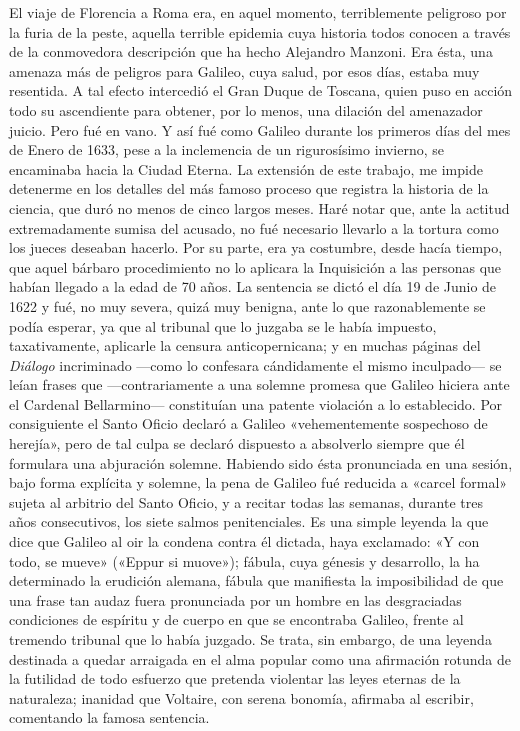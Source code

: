 \documentclass[a4paper, 12pt, draft]{article}
\begin{document}
{El viaje de Florencia a Roma era, en aquel momento, terriblemente peligroso por la furia de la peste, aquella terrible epidemia cuya historia todos conocen a través de la conmovedora descripción que ha hecho Alejandro Manzoni. Era ésta, una amenaza más de peligros para Galileo, cuya salud, por esos días, estaba muy resentida. A tal efecto intercedió el Gran Duque de Toscana, quien puso en acción todo su ascendiente para obtener, por lo menos, una dilación del amenazador juicio. Pero fué en vano. Y así fué como Galileo durante los primeros días del mes de Enero de 1633, pese a la inclemencia de un rigurosísimo invierno, se encaminaba hacia la Ciudad Eterna. La extensión de este trabajo, me impide detenerme en los detalles del más famoso proceso que registra la historia de la ciencia, que duró no menos de cinco largos meses. Haré notar que, ante la actitud extremadamente sumisa del acusado, no fué necesario llevarlo a la tortura como los jueces deseaban hacerlo. Por su parte, era ya costumbre, desde hacía tiempo, que aquel bárbaro procedimiento no lo aplicara la Inquisición a las personas que habían llegado a la edad de 70 años. La sentencia se dictó el día 19 de Junio de 1622 y fué, no muy severa, quizá muy benigna, ante lo que razonablemente se podía esperar, ya que al tribunal que lo juzgaba se le había impuesto, taxativamente, aplicarle la censura anticopernicana; y en muchas páginas del \textit{ Diálogo} incriminado ---como lo confesara cándidamente el mismo inculpado--- se leían frases que ---contrariamente a una solemne promesa que Galileo hiciera ante el Cardenal Bellarmino--- constituían una patente violación a lo establecido. Por consiguiente el Santo Oficio declaró a Galileo «vehementemente sospechoso de herejía», pero de tal culpa se declaró dispuesto a absolverlo siempre que él formulara una abjuración solemne. Habiendo sido ésta pronunciada en una sesión, bajo forma explícita y solemne, la pena de Galileo fué reducida a «carcel formal» sujeta al arbitrio del Santo Oficio, y a recitar todas las semanas, durante tres años consecutivos, los siete salmos penitenciales. Es una simple leyenda la que dice que Galileo al oir la condena contra él dictada, haya exclamado: «Y con todo, se mueve» («Eppur si muove»); fábula, cuya génesis y desarrollo, la ha determinado la erudición alemana, fábula que manifiesta la imposibilidad de que una frase tan audaz fuera pronunciada por un hombre en las desgraciadas condiciones de espíritu y de cuerpo en que se encontraba Galileo, frente al tremendo tribunal que lo había juzgado. Se trata, sin embargo, de una leyenda destinada a quedar arraigada en el alma popular como una afirmación rotunda de la futilidad de todo esfuerzo que pretenda violentar las leyes eternas de la naturaleza; inanidad que Voltaire, con serena bonomía, afirmaba al escribir, comentando la famosa sentencia.


}
\end{document}
